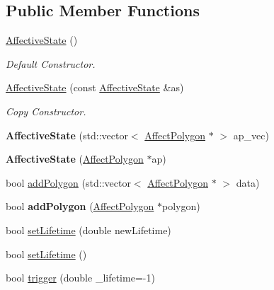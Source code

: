 \subsection*{\-Public \-Member \-Functions}
\begin{DoxyCompactItemize}
\item 
\hypertarget{class_affective_state_a65e6807f1091c79f44a84c95adb1b4fd}{
\hyperlink{class_affective_state_a65e6807f1091c79f44a84c95adb1b4fd}{\-Affective\-State} ()}
\label{class_affective_state_a65e6807f1091c79f44a84c95adb1b4fd}

\begin{DoxyCompactList}\small\item\em \-Default \-Constructor. \end{DoxyCompactList}\item 
\hypertarget{class_affective_state_a8573788f95c382b5eb6037a2b4f3aa1a}{
\hyperlink{class_affective_state_a8573788f95c382b5eb6037a2b4f3aa1a}{\-Affective\-State} (const \hyperlink{class_affective_state}{\-Affective\-State} \&as)}
\label{class_affective_state_a8573788f95c382b5eb6037a2b4f3aa1a}

\begin{DoxyCompactList}\small\item\em \-Copy \-Constructor. \end{DoxyCompactList}\item 
\hypertarget{class_affective_state_af9b8433c91ed8e02978c3b42ed5ac6b4}{
{\bfseries \-Affective\-State} (std\-::vector$<$ \hyperlink{class_affect_polygon}{\-Affect\-Polygon} $\ast$ $>$ ap\-\_\-vec)}
\label{class_affective_state_af9b8433c91ed8e02978c3b42ed5ac6b4}

\item 
\hypertarget{class_affective_state_a08fc349147b79539acd264b73cec7f26}{
{\bfseries \-Affective\-State} (\hyperlink{class_affect_polygon}{\-Affect\-Polygon} $\ast$ap)}
\label{class_affective_state_a08fc349147b79539acd264b73cec7f26}

\item 
bool \hyperlink{class_affective_state_af7ac4f21de22c0ab43e3889458c61ff2}{add\-Polygon} (std\-::vector$<$ \hyperlink{class_affect_polygon}{\-Affect\-Polygon} $\ast$ $>$ data)
\item 
\hypertarget{class_affective_state_a0736c2a1ef6341a6220e10460eeda7dc}{
bool {\bfseries add\-Polygon} (\hyperlink{class_affect_polygon}{\-Affect\-Polygon} $\ast$polygon)}
\label{class_affective_state_a0736c2a1ef6341a6220e10460eeda7dc}

\item 
bool \hyperlink{class_affective_state_a3b824330921fc05fe7dd2f49eec150d2}{set\-Lifetime} (double new\-Lifetime)
\item 
bool \hyperlink{class_affective_state_ae03bf91dc1939016fcd45ceb60e7cbf5}{set\-Lifetime} ()
\item 
\hypertarget{class_affective_state_a7054661d256830354e34c71549d2b4ae}{
bool \hyperlink{class_affective_state_a7054661d256830354e34c71549d2b4ae}{trigger} (double \-\_\-lifetime=-\/1)}
\label{class_affective_state_a7054661d256830354e34c71549d2b4ae}


\end{DoxyCompactItemize}
